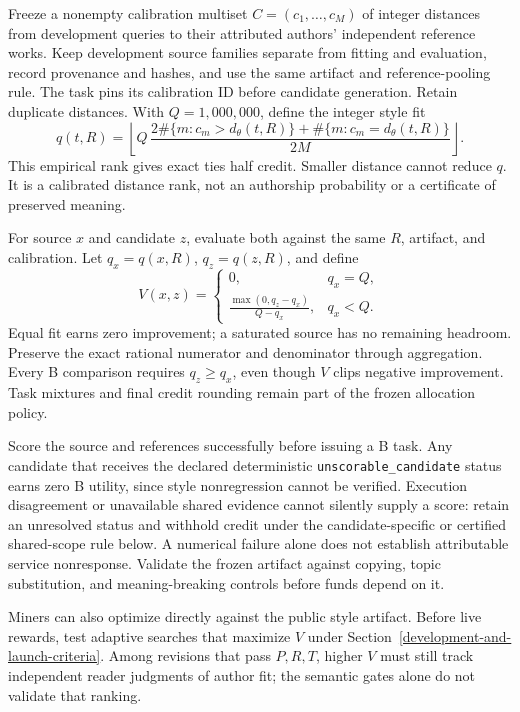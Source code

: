 Freeze a nonempty calibration multiset \(C=(c_1,\ldots,c_M)\) of
integer distances from development queries to their attributed authors'
independent reference works. Keep development source families separate
from fitting and evaluation, record provenance and hashes, and use the
same artifact and reference-pooling rule. The task pins its calibration
ID before candidate generation. Retain duplicate distances. With
\(Q=1{,}000{,}000\), define the integer style fit
\begin{equation}\label{eq:style-fit}
 q(t,R)=\left\lfloor
 Q\,\frac{2\#\{m:c_m>d_\theta(t,R)\}
             +\#\{m:c_m=d_\theta(t,R)\}}{2M}
 \right\rfloor.
\end{equation}
This empirical rank gives exact ties half credit. Smaller distance
cannot reduce \(q\). It is a calibrated distance rank, not an authorship
probability or a certificate of preserved meaning.

For source \(x\) and candidate \(z\), evaluate both against the same
\(R\), artifact, and calibration. Let \(q_x=q(x,R)\), \(q_z=q(z,R)\),
and define
\begin{equation}\label{eq:style-utility}
 V(x,z)=\begin{cases}
 0,&q_x=Q,\\
 \displaystyle\frac{\max(0,q_z-q_x)}{Q-q_x},&q_x<Q.
 \end{cases}
\end{equation}
Equal fit earns zero improvement; a saturated source has no remaining
headroom. Preserve the exact rational numerator and denominator through
aggregation. Every B comparison requires
\(q_z\geq q_x\), even though \(V\) clips negative improvement.
Task mixtures and final credit rounding remain part of the frozen
allocation policy.

Score the source and references successfully before issuing a B task.
Any candidate that receives the declared deterministic
\texttt{unscorable\_candidate} status earns zero B utility, since style
nonregression cannot be verified.
Execution disagreement or unavailable shared evidence cannot
silently supply a score: retain an unresolved status and withhold
credit under the candidate-specific or certified shared-scope rule below. A numerical failure alone does not establish
attributable service nonresponse. Validate the frozen artifact against
copying, topic substitution, and meaning-breaking controls before
funds depend on it.

Miners can also optimize directly against the public style artifact.
Before live rewards, test adaptive searches that maximize \(V\) under
Section~\ref{development-and-launch-criteria}. Among revisions that pass
\(P,R,T\), higher \(V\) must still track independent reader judgments
of author fit; the semantic gates alone do not validate that ranking.

